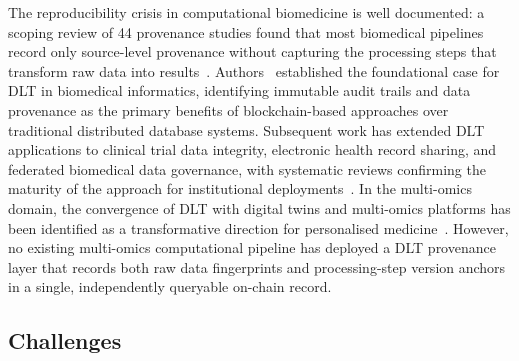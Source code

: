 \documentclass[5p,times,twocolumn]{elsarticle}
\newcommand{\lang}[1]{#1}
\begin{document}
The reproducibility crisis in computational
biomedicine is \lang{well documented}: a scoping review
of 44 provenance studies found that most biomedical
pipelines record only source-level provenance
without capturing the processing steps that
transform raw data into results~\cite{johns2023data}.
Authors~\cite{kuo2017blockchain} established the
foundational case for DLT in biomedical informatics,
identifying immutable audit trails and data
provenance as the primary benefits of
blockchain-based approaches over traditional
distributed database systems.
Subsequent work has extended DLT applications
to clinical trial data integrity, electronic health
record sharing, and federated biomedical data
governance, with systematic reviews confirming
the maturity of the approach for institutional
deployments~\cite{lacson2024biomedical}.
In the multi-omics domain, the convergence of DLT
with digital twins and multi-omics platforms has
been identified as a transformative direction for
personalised medicine~\cite{mohr2024navigating}.
However, no existing multi-omics computational
pipeline has deployed a DLT provenance layer
that records both raw data fingerprints and
processing-step version anchors in a single,
independently queryable on-chain record.

\subsection{\textbf{Challenges}}
\end{document}
